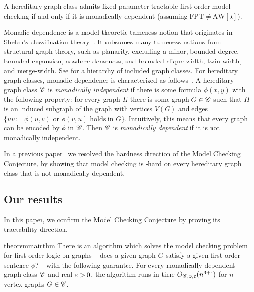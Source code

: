 \begin{mcconjecture}\label{conj:main2}
  A hereditary graph class admits fixed-parameter tractable first-order model checking if and only if it is monadically dependent (assuming $\mathrm{FPT}{\neq}\mathrm{AW}[\star]$).
\end{mcconjecture}


  
Monadic dependence is a model-theoretic tameness notion that originates in Shelah's classification theory~\cite{BS1985monadic}.
It subsumes many tameness notions from structural graph theory, such as planarity, excluding a minor, bounded degree, bounded expansion, nowhere denseness, and bounded clique-width, twin-width, and merge-width.
See  for a hierarchy of included graph classes.
For hereditary graph classes, monadic dependence is characterized as follows~\cite{flip-breakability}.
A hereditary graph class $\mathscr C$ is \emph{monadically independent} if there is some formula $\phi(x,y)$ with the following property: for every graph \(H\) there is some graph $G \in \mathscr C$ 
such that $H$ is an induced subgraph of the graph with vertices $V(G)$ and edges \(\{ uv \,:\, \text{ $\phi(u,v)$ or $\phi(v,u)$ holds in $G$} \}\).
Intuitively, this means that every graph can be encoded by $\phi$ in $\mathscr C$.
Then $\mathscr C$ is \emph{monadically dependent} if it is not monadically independent.

\medskip
In a previous paper~\cite{flip-breakability} we resolved the hardness direction of the Model Checking Conjecture, by showing that model checking is 
\AWstar-hard on every hereditary graph class that is not monadically dependent.

\subsection{Our results}
In this paper, we confirm the Model Checking Conjecture by proving its tractability direction.

\begin{restatable}{theorem}{mainthm}\label{thm:main}
  There is an algorithm which
  solves the model checking problem for first-order logic on graphs --
  does a given graph $G$ satisfy a given first-order sentence $\phi$?  -- with the following guarantee.
  For every monadically dependent graph class $\mathscr C$ and real $\varepsilon>0$, the algorithm runs in time $O_{\mathscr C,\varphi,\varepsilon}(n^{3+\varepsilon})$ for $n$-vertex graphs $G\in\mathscr C$.
\end{restatable}

